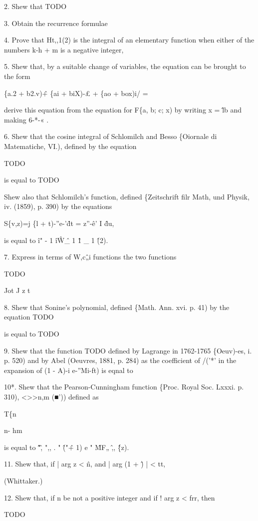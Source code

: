 2. Shew that TODO

3. Obtain the recurrence formulae

4. Prove that Ht,,1(2) is the integral of an elementary function when
either of the numbers k-h + m is a negative integer,

5. Shew that, by a suitable change of variables, the equation can be
brought to the form

\{a.2 + b2.v)\^ + \{ai + biX)-£ + \{ao + box)i/ =

derive this equation from the equation for F\{a, b; c; x) by writing x
= \^lb and making 6-*-« .

6. Shew that the cosine integral of Schlomilch and Besso \{Oiornale di
Matematiche, VI.), defined by the equation

TODO

is equal to TODO

Shew also that Schlomilch's function, defined \{Zeitschrift filr Math,
und Physik, iv. (1859), p. 390) by the equations

S\{v,z)=j \{l + t)-''e-'\^dt = z''-\^e' I \^du,

is equal to \^i" - 1 \^i\^ W\^ \_ 1 \^ 1 \_ 1 \^ (2).

7. Express in terms of W,c\^„i functions the two functions

TODO

Jot J z t

8. Shew that Sonine's polynomial, defined \{Math. Ann. xvi. p. 41) by
the equation TODO

is equal to TODO

%
%

9. Shew that the function TODO defined by Lagrange in 1762-1765
\{Oeuv)-es, i. p. 520) and by Abel (Oeuvres, 1881, p. 284) as the
coefficient of /('*' in the expansion of (1 - A)-i e-''Mi-ft) is eqnal
to

10*. Shew that the Pearson-Cunningham function \{Proc. Royal Soc.
Lxxxi. p. 310), <>>n,m (■')) defined as

T\{n

n- hm

is equal to \^ "\^, ",, . " \^ ("\^ + 1) e " \^MF„ \^,, \^ \{z).

11. Shew that, if | arg z < \^n, and | arg (1 + \^) | < tt,

(Whittaker.)

12. Shew that, if n be not a positive integer and if ! arg z < frr,
then

TODO

